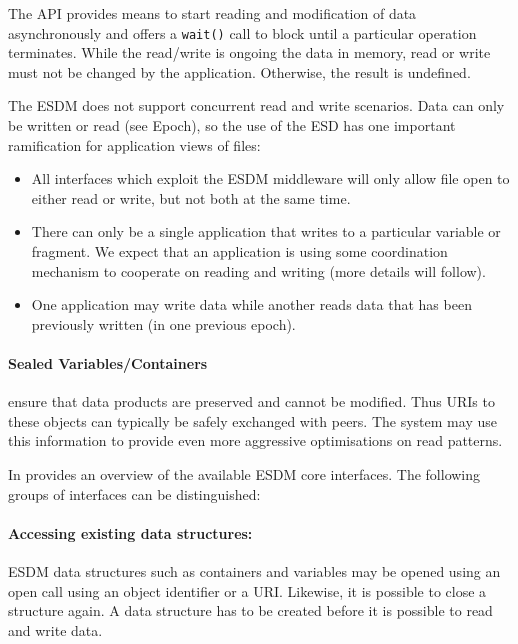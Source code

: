 The API provides means to start reading and modification of data asynchronously and offers a \texttt{wait()} call to block until a particular operation terminates.
While the read/write is ongoing the data in memory, read or write must not be changed by the application. Otherwise, the result is undefined.

The ESDM does not support concurrent read and write scenarios. Data can only be written or read (see Epoch), so the use of the ESD has one important ramification for application views of files:
\begin{itemize}
\item All interfaces which exploit the ESDM middleware will only allow file open to either read or write, but not both at the same time.
\item There can only be a single application that writes to a particular variable or fragment.
We expect that an application is using some coordination mechanism to cooperate on reading and writing (more details will follow).
\item One application may write data while another reads data that has been previously written (in one previous epoch).
\end{itemize}


\paragraph{Sealed Variables/Containers} ensure that data products are preserved and cannot be modified. Thus URIs to these objects can typically be safely exchanged with peers.
The system may use this information to provide even more aggressive optimisations on read patterns.

\bigskip


In  provides an overview of the available ESDM core interfaces.
The following groups of interfaces can be distinguished:

\paragraph{Accessing existing data structures:}
ESDM data structures such as containers and variables may be opened using an open call using an object identifier or a URI.
Likewise, it is possible to close a structure again.
A data structure has to be created before it is possible to read and write data.

